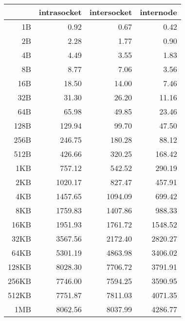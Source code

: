 \begin{center}
  \begin{tabular}{ | r | r | r | r|}
    \hline
      & intrasocket & intersocket & internode \\ \hline
    1B & 0.92 & 0.67 & 0.42\\ \hline
    2B & 2.28 & 1.77 & 0.90\\ \hline
    4B & 4.49 & 3.55 & 1.83\\ \hline
    8B & 8.77 & 7.06 & 3.56 \\ \hline
    16B & 18.50 & 14.00 & 7.46 \\ \hline
    32B & 31.30 & 26.20 & 11.16 \\ \hline
    64B & 65.98 & 49.85 & 23.46\\ \hline
    128B & 129.94 & 99.70 & 47.50 \\ \hline
    256B & 246.75 & 180.28 & 88.12 \\ \hline
    512B & 426.66 & 320.25 & 168.42 \\ \hline
    1KB & 757.12 & 542.52 & 290.19 \\ \hline
    2KB & 1020.17 & 827.47 & 457.91 \\ \hline
    4KB & 1457.65 & 1094.09 & 699.42 \\ \hline
    8KB & 1759.83 & 1407.86 & 988.33 \\ \hline
    16KB & 1951.93 & 1761.72 & 1548.52 \\ \hline
    32KB & 3567.56 & 2172.40 & 2820.27 \\ \hline
    64KB & 5301.19 & 4863.98 & 3406.02 \\ \hline
    128KB & 8028.30 & 7706.72 & 3791.91 \\ \hline
    256KB & 7746.00 & 7594.25 & 3590.95 \\ \hline
    512KB & 7751.87 & 7811.03 & 4071.35 \\ \hline
    1MB & 8062.56 & 8037.99 & 4286.77 \\ \hline
\end{tabular}
\end{center}
